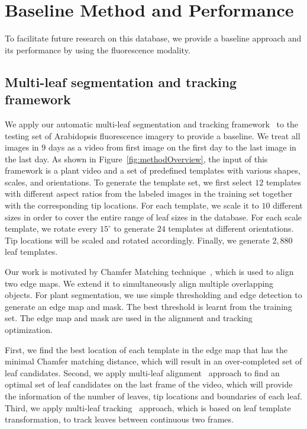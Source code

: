 \section{Baseline Method and Performance}
\label{sec:baseline}

To facilitate future research on this database, we provide a baseline approach and its performance by using the fluorescence modality.

\subsection{Multi-leaf segmentation and tracking framework}
We apply our automatic multi-leaf segmentation and tracking framework~\cite{yin2014a,yin2014b} to the testing set of Arabidopsis fluorescence imagery to provide a baseline.
We treat all images in $9$ days as a video from first image on the first day to the last image in the last day. 
As shown in Figure~\ref{fig:methodOverview}, the input of this framework is a plant video and a set of predefined templates with various shapes, scales, and orientations.
To generate the template set, we first select $12$ templates with different aspect ratios from the labeled images in the training set together with the corresponding tip locations.
For each template, we scale it to $10$ different sizes in order to cover the entire range of leaf sizes in the database.
For each scale template, we rotate every $15^{\circ}$ to generate $24$ templates at different orientations.
Tip locations will be scaled and rotated accordingly.
Finally, we generate $2,880$ leaf templates.



Our work is motivated by Chamfer Matching technique~\cite{barrow1977parametric}, which is used to align two edge maps.
We extend it to simultaneously align multiple overlapping objects.
For plant segmentation, we use simple thresholding and edge detection to generate an edge map and mask.
The best threshold is learnt from the training set.
The edge map and mask are used in the alignment and tracking optimization. 

First, we find the best location of each template in the edge map that has the minimal Chamfer matching distance, which will result in an over-completed set of leaf candidates.
Second, we apply multi-leaf alignment~\cite{yin2014a} approach to find an optimal set of leaf candidates on the last frame of the video, which will provide the information of the number of leaves, tip locations and boundaries of each leaf.
Third, we apply multi-leaf tracking~\cite{yin2014b} approach, which is based on leaf template transformation, to track leaves between continuous two frames.

